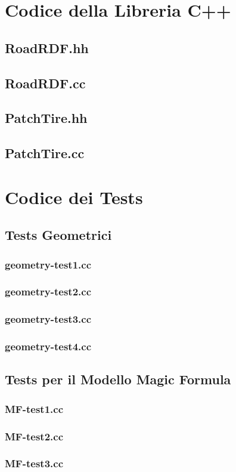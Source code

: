 \chapter{Codice della Libreria C++}
\label{LibraryCode}
%
\section{RoadRDF.hh}

%
\section{RoadRDF.cc}

%
\section{PatchTire.hh}

%
\section{PatchTire.cc}

%
\chapter{Codice dei Tests}
\label{TestsCode}
%
\section{Tests Geometrici}
%
\subsection{geometry-test1.cc}

%
\subsection{geometry-test2.cc}

%
\subsection{geometry-test3.cc}

%
\subsection{geometry-test4.cc}

%
\section{Tests per il Modello Magic Formula}
%
\subsection{MF-test1.cc}

%
\subsection{MF-test2.cc}

%
\subsection{MF-test3.cc}
